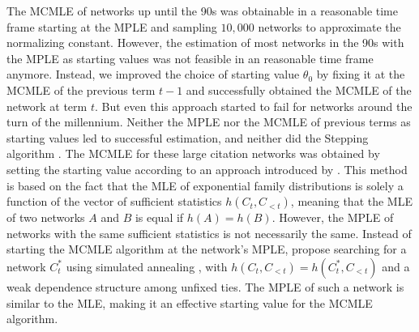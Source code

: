 \documentclass[headsepline=true, abstracton]{scrartcl}
\begin{document}
The MCMLE of networks up until the 90s was obtainable in a reasonable time frame starting at the MPLE and sampling $10,000$ networks to approximate the normalizing constant. However, the estimation of most networks in the 90s with the MPLE as starting values was not feasible in an reasonable time frame anymore. Instead, we improved the choice of starting value $\theta_0$ by fixing it at the MCMLE of the previous term $t-1$ and successfully obtained the MCMLE of the network at term $t$. But even this approach started to fail for networks around the turn of the millennium. Neither the MPLE nor the MCMLE of previous terms as starting values led to successful estimation, and neither did the Stepping algorithm \citep{hummel2012improving}. 
The MCMLE for these large citation networks was obtained by setting the starting value according to an approach introduced by \citet{SchmidHunter2020}. This method is based on the fact that the MLE of exponential family distributions is solely a function of the vector of sufficient statistics $h(C_t, C_{<t})$, meaning that the MLE of two networks $A$ and $B$ is equal if $h(A)=h(B)$. However, the MPLE of networks with the same sufficient statistics is not necessarily the same. Instead of starting the MCMLE algorithm at the network's MPLE, \citet{SchmidHunter2020} propose searching for a network $C_t^*$ using simulated annealing \citep{Kirkpatrick83}, with $h(C_t, C_{<t}) = h(C_t^*, C_{<t})$ and a weak dependence structure among unfixed ties. The MPLE of such a network is similar to the MLE, making it an effective starting value for the MCMLE algorithm.



\end{document}
